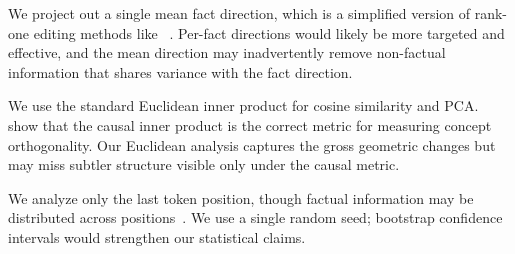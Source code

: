  We project out a single mean fact direction, which is a simplified version of rank-one editing methods like \rome~\citep{meng2022locating}. Per-fact directions would likely be more targeted and effective, and the mean direction may inadvertently remove non-factual information that shares variance with the fact direction.

 We use the standard Euclidean inner product for cosine similarity and PCA. \citet{park2023linear} show that the causal inner product is the correct metric for measuring concept orthogonality. Our Euclidean analysis captures the gross geometric changes but may miss subtler structure visible only under the causal metric.

 We analyze only the last token position, though factual information may be distributed across positions~\citep{yu2023neuron}. We use a single random seed; bootstrap confidence intervals would strengthen our statistical claims.
